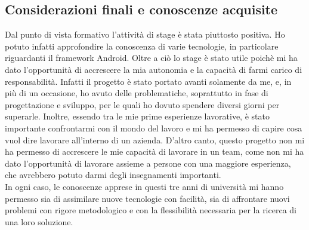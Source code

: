 \documentclass[../Tesi.tex]{subfiles}
\begin{document}
	\subsection{Considerazioni finali e conoscenze acquisite}
	Dal punto di vista formativo l'attività di stage è stata piuttosto positiva. Ho potuto infatti approfondire la conoscenza di varie tecnologie, in particolare riguardanti il framework Android. Oltre a ciò lo stage è stato utile poichè mi ha dato l'opportunità di accrescere la mia autonomia e la capacità di farmi carico di responsabilità. Infatti il progetto è stato portato avanti solamente da me, e, in più di un occasione, ho avuto delle problematiche, soprattutto in fase di progettazione e sviluppo, per le quali ho dovuto spendere diversi giorni per superarle. Inoltre, essendo tra le mie prime esperienze lavorative, è stato importante confrontarmi con il mondo del lavoro e mi ha permesso di capire cosa vuol dire lavorare all'interno di un azienda. D'altro canto, questo progetto non mi ha permesso di accrescere le mie capacità di lavorare in un team, come non mi ha dato l'opportunità di lavorare assieme a persone con una maggiore esperienza, che avrebbero potuto darmi degli insegnamenti importanti.\\
	In ogni caso, le conoscenze apprese in questi tre anni di università mi hanno permesso sia di assimilare nuove tecnologie con facilità, sia di affrontare nuovi problemi con rigore metodologico e con la flessibilità necessaria per la ricerca di una loro soluzione. 
\end{document}
